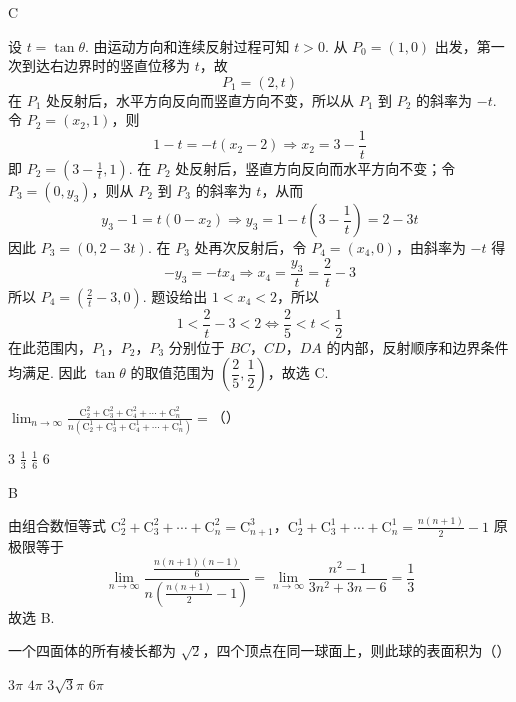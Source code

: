 \begin{answer}
C
\end{answer}

\begin{solution}
设 \(t=\tan\theta\). 由运动方向和连续反射过程可知 \(t>0\). 从 \(P_0=(1,0)\) 出发，第一次到达右边界时的竖直位移为 \(t\)，故
\[
P_1=(2,t)
\]
在 \(P_1\) 处反射后，水平方向反向而竖直方向不变，所以从 \(P_1\) 到 \(P_2\) 的斜率为 \(-t\). 令 \(P_2=(x_2,1)\)，则
\[
1-t=-t(x_2-2)\Longrightarrow x_2=3-\frac1t
\]
即 \(P_2=\left(3-\frac1t,1\right)\). 在 \(P_2\) 处反射后，竖直方向反向而水平方向不变；令 \(P_3=(0,y_3)\)，则从 \(P_2\) 到 \(P_3\) 的斜率为 \(t\)，从而
\[
y_3-1=t(0-x_2)\Longrightarrow y_3=1-t\left(3-\frac1t\right)=2-3t
\]
因此 \(P_3=(0,2-3t)\). 在 \(P_3\) 处再次反射后，令 \(P_4=(x_4,0)\)，由斜率为 \(-t\) 得
\[
-y_3=-tx_4\Longrightarrow x_4=\frac{y_3}{t}=\frac2t-3
\]
所以 \(P_4=\left(\frac2t-3,0\right)\).
题设给出 \(1<x_4<2\)，所以
\[
1<\frac2t-3<2\Longleftrightarrow \frac25<t<\frac12
\]
在此范围内，\(P_1\)，\(P_2\)，\(P_3\) 分别位于 \(BC\)，\(CD\)，\(DA\) 的内部，反射顺序和边界条件均满足. 因此 \(\tan\theta\) 的取值范围为 \(\left(\dfrac25,\dfrac12\right)\)，故选 C.
\end{solution}

\begin{problem}
\(\displaystyle\lim_{n\to \infty}\frac{\mathrm C_2^2 + \mathrm C_3^2 + \mathrm C_4^2 + \cdots + \mathrm C_n^2}{n(\mathrm C_2^1 + \mathrm C_3^1 + \mathrm C_4^1 + \cdots + \mathrm C_n^1)} =\)（\quad）

\choices
    {3}
    {\( \frac{1}{3} \)}
    {\( \frac{1}{6} \)}
    {6}
\end{problem}

\begin{answer}
B
\end{answer}

\begin{solution}
由组合数恒等式
\(\mathrm C_2^2+\mathrm C_3^2+\cdots+\mathrm C_n^2=\mathrm C_{n+1}^3\)，\(\mathrm C_2^1+\mathrm C_3^1+\cdots+\mathrm C_n^1=\frac{n(n+1)}2-1\)
原极限等于
\[
\lim_{n\to\infty}\frac{\frac{n(n+1)(n-1)}6}{n\left(\frac{n(n+1)}2-1\right)}=\lim_{n\to\infty}\frac{n^2-1}{3n^2+3n-6}=\frac13
\]
故选 B.
\end{solution}

\begin{problem}
一个四面体的所有棱长都为 \(\sqrt{2}\)，四个顶点在同一球面上，则此球的表面积为（\quad）

\choices
    {\(3\pi\)}
    {\(4\pi\)}
    {\(3\sqrt{3}\pi\)}
    {\(6\pi\)}
\end{problem}

